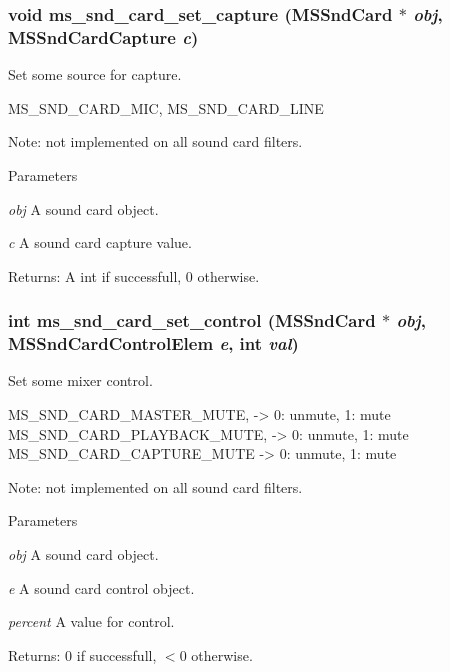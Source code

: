 \subsubsection[{ms\_\-snd\_\-card\_\-set\_\-capture}]{\setlength{\rightskip}{0pt plus 5cm}void ms\_\-snd\_\-card\_\-set\_\-capture ({\bf MSSndCard} $\ast$ {\em obj}, \/  {\bf MSSndCardCapture} {\em c})}\label{group__mediastreamer2__soundcardfilter_gad82af792f27b04b9220f2406a2c84fc1}
Set some source for capture.


\begin{DoxyPre}
   MS\_SND\_CARD\_MIC,
   MS\_SND\_CARD\_LINE
 \end{DoxyPre}
 Note: not implemented on all sound card filters.


\begin{DoxyParams}{Parameters}
\item[{\em obj}]A sound card object. \item[{\em c}]A sound card capture value.\end{DoxyParams}
Returns: A int if successfull, 0 otherwise. 
\subsubsection[{ms\_\-snd\_\-card\_\-set\_\-control}]{\setlength{\rightskip}{0pt plus 5cm}int ms\_\-snd\_\-card\_\-set\_\-control ({\bf MSSndCard} $\ast$ {\em obj}, \/  {\bf MSSndCardControlElem} {\em e}, \/  int {\em val})}\label{group__mediastreamer2__soundcardfilter_ga48c957a6033dd92979545744a95d2de5}
Set some mixer control.


\begin{DoxyPre}
   MS\_SND\_CARD\_MASTER\_MUTE, -> 0: unmute, 1: mute
   MS\_SND\_CARD\_PLAYBACK\_MUTE, -> 0: unmute, 1: mute
   MS\_SND\_CARD\_CAPTURE\_MUTE -> 0: unmute, 1: mute
 \end{DoxyPre}
 Note: not implemented on all sound card filters.


\begin{DoxyParams}{Parameters}
\item[{\em obj}]A sound card object. \item[{\em e}]A sound card control object. \item[{\em percent}]A value for control.\end{DoxyParams}
Returns: 0 if successfull, $<$0 otherwise. 
